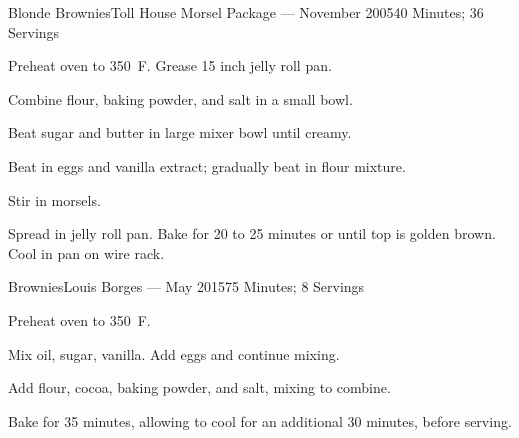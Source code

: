 \documentclass{article}
\begin{document}
\begin{recipe}{Blonde Brownies}{Toll House Morsel Package --- November 2005}{40 Minutes; 36 Servings}

   \newstep
   Preheat oven to 350\ \0F. Grease 15 inch jelly roll pan.

   Combine flour, baking powder, and salt in a small bowl.

   Beat sugar and butter in large mixer bowl until creamy.

   Beat in eggs and vanilla extract; gradually beat in flour mixture.

   Stir in morsels.

   \newstep
   Spread in jelly roll pan.  Bake for 20 to 25 minutes or until top is golden brown.  Cool in pan on wire rack.

\end{recipe}

\begin{recipe}{Brownies}{Louis Borges --- May 2015}{75 Minutes; 8 Servings}

   \newstep
   Preheat oven to 350\ \0F.

   Mix oil, sugar, vanilla.  Add eggs and continue mixing.

   Add flour, cocoa, baking powder, and salt, mixing to combine.

   \newstep
   Bake for 35 minutes, allowing to cool for an additional 30 minutes, before serving.

\end{recipe}
 
\end{document}
